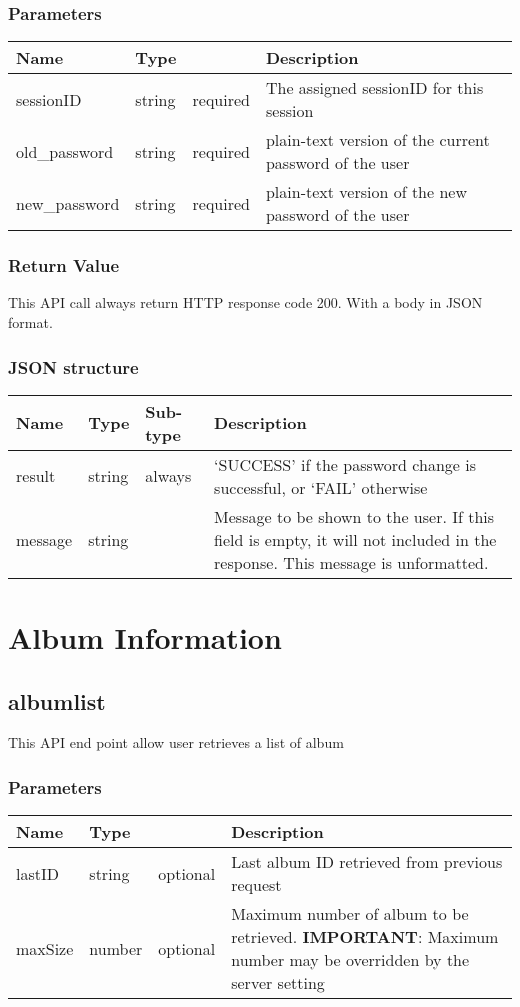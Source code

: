 \documentclass[a4paper,12pt]{report}
\begin{document}
	\subsection{Parameters}
	\begin{tabular}{|l|ll|p{10cm}|}
		\hline
		Name & Type & & Description\\\hline
		sessionID & string & required & The assigned sessionID for this session\\\hline
		old\_password & string & required & plain-text version of the current password of the user\\\hline
		new\_password & string & required & plain-text version of the new password of the user\\\hline
	\end{tabular}
	\subsection{Return Value}
	This API call always return HTTP response code 200. With a body in JSON format.
	\subsection{JSON structure}
	\begin{tabular}{|l|l|l|p{10cm}|}
		\hline
		Name & Type & Sub-type & Description\\\hline
		result & string & always & 	`SUCCESS' if the password change is successful, or\newline
		`FAIL' otherwise\\\hline
		message & string & & Message to be shown to the user. If this field is empty, it will not included in the response. This message is unformatted.\\\hline
	\end{tabular}
	\chapter{Album Information}
	
	\section{albumlist}
	This API end point allow user retrieves a list of album
	\subsection{Parameters}
	\begin{tabular}{|l|ll|p{10cm}|}
		\hline
		Name & Type & & Description\\\hline
		lastID & string & optional & Last album ID retrieved from previous request\\\hline
		maxSize & number & optional & Maximum number of album to be retrieved.\newline
		\textbf{IMPORTANT}: Maximum number may be overridden by the server setting \\\hline
	\end{tabular}
\end{document}
